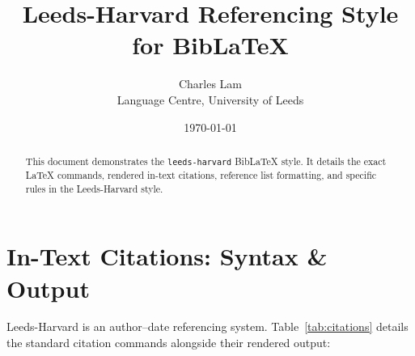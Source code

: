 \documentclass[a4paper,11pt]{article}
\title{Leeds-Harvard Referencing Style for BibLaTeX}
\author{Charles Lam\\Language Centre, University of Leeds}
\date{\today}
\begin{document}
\maketitle

\begin{abstract}
This document demonstrates the \texttt{leeds-harvard} BibLaTeX style. It details the exact \LaTeX{} commands, rendered in-text citations, reference list formatting, and specific rules in the Leeds-Harvard style.
\end{abstract}

\section{In-Text Citations: Syntax \& Output}

Leeds-Harvard is an author--date referencing system. Table~\ref{tab:citations} details the standard citation commands alongside their rendered output:
\end{document}
